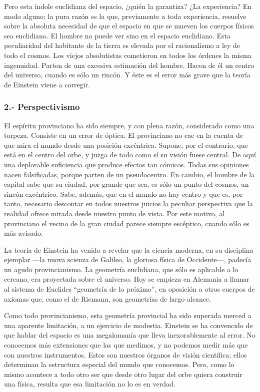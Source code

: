 \documentclass[a4paper, 12pt]{article}
\begin{document}
Pero esta índole euclidiana del espacio, ¿quién la garantiza? ¿La
experiencia? En modo alguno; la pura razón es la que, previamente a toda
experiencia, resuelve sobre la absoluta necesidad de que el espacio en que
se mueven los cuerpos físicos sea euclidiano. El hombre no puede ver sino
en el espacio euclidiano. Esta peculiaridad del habitante de la tierra es
elevada por el racionalismo a ley de todo el cosmos. Los viejos
absolutistas cometieron en todos los órdenes la misma ingenuidad. Parten
de una excesiva estimación del hombre. Hacen de él un centro del universo,
cuando es sólo un rincón. Y éste es el error más grave que la teoría de
Einstein viene a corregir.

\subsubsection*{2.- Perspectivismo}

El espíritu provinciano ha sido siempre, y con plena razón, considerado
como una torpeza. Consiste en un error de óptica. El provinciano no cae en
la cuenta de que mira el mundo desde una posición excéntrica. Supone, por
el contrario, que está en el centro del orbe, y juzga de todo como sí su
visión fuese central. De aquí una deplorable suficiencia que produce
efectos tan cómicos. Todas sus opiniones nacen falsificadas, porque parten
de un pseudocentro. En cambio, el hombre de la capital sabe que su ciudad,
por grande que sea, es sólo un punto del cosmos, un rincón excéntrico.
Sabe, además, que en el mundo no hay centro y que es, por tanto, necesario
descontar en todos nuestros juicios la peculiar perspectiva que la
realidad ofrece mirada desde nuestro punto de vista. Por este motivo, al
provinciano el vecino de la gran ciudad parece siempre escéptico, cuando
sólo es más avisado.

La teoría de Einstein ha venido a revelar que la ciencia moderna, en su
disciplina ejemplar ---la nuova scienza de Galileo, la gloriosa física de
Occidente---, padecía un agudo provincianismo. La geometría euclidiana, que
sólo es aplicable a lo cercano, era proyectada sobre el universo. Hoy se
empieza en Alemania a llamar al sistema de Euclides ``geometría de lo
próximo'', en oposición a otros cuerpos de axiomas que, como el de Riemann,
son geometrías de largo alcance.

Como todo provincianismo, esta geometría provincial ha sido superada
merced a una aparente limitación, a un ejercicio de modestia. Einstein se
ha convencido de que hablar del espacio es una megalomanía que lleva
inexorablemente al error. No conocemos más extensiones que las que
medimos, y no podemos medir más que con nuestros instrumentos. Estos son
nuestros órganos de visión científica; ellos determinan la estructura
especial del mundo que conocemos. Pero, como lo mismo acontece a todo otro
ser que desde otro lugar del orbe quiera construir una física, resulta que
esa limitación no lo es en verdad.
\end{document}
